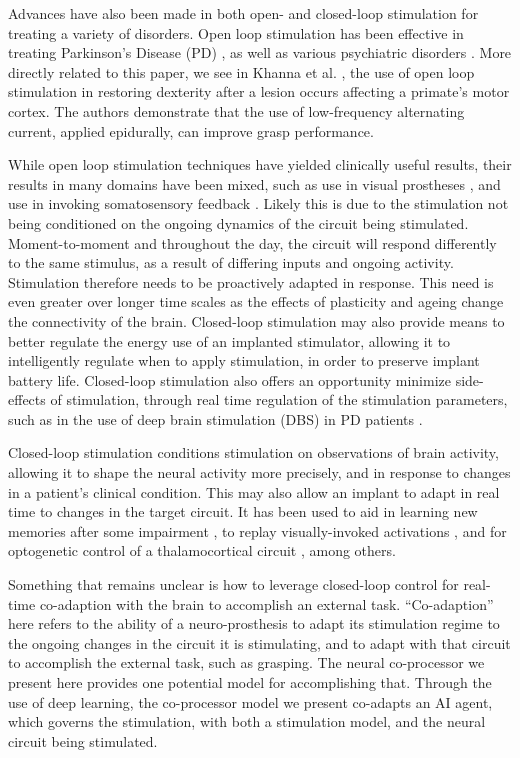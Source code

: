 \documentclass[12pt]{iopart}
\begin{document}
Advances have also been made in both open- and closed-loop stimulation for
treating a variety of disorders. Open loop stimulation has been effective in
treating Parkinson's Disease (PD) \cite{benabid.parkinsons}, as well as various
psychiatric disorders \cite{holtzheimer.psy, kisely.psy, fraint.psy}.
More directly related to this paper, we see in Khanna et al. \cite{khanna.openloop},
the use of open loop stimulation in restoring dexterity after a lesion
occurs affecting a primate's motor cortex. The authors demonstrate that
the use of low-frequency alternating current, applied epidurally,
can improve grasp performance.

While open loop stimulation techniques have yielded clinically useful results,
their results in many domains have been mixed, such as use in visual
prostheses \cite{bosking.visual}, and use in invoking somatosensory feedback
\cite{cronin.tact}. Likely this is due to the stimulation not being conditioned
on the ongoing dynamics of the circuit being stimulated. Moment-to-moment and
throughout the day, the circuit will respond differently to the same stimulus,
as a result of differing inputs and ongoing activity. Stimulation
therefore needs to be proactively adapted in response. This need is even
greater over longer time scales as the effects of plasticity and ageing change
the connectivity of the brain. Closed-loop stimulation may also provide means
to better regulate the energy use of an implanted stimulator, allowing it to
intelligently regulate when to apply stimulation, in order to preserve implant
battery life. Closed-loop stimulation also offers an opportunity minimize
side-effects of stimulation, through real time regulation
of the stimulation parameters, such as in the use of deep brain stimulation (DBS) in
PD patients \cite{little.park}.

Closed-loop stimulation conditions stimulation on observations of brain activity,
allowing it to shape the neural activity more precisely, and in response to changes
in a patient's clinical condition. This may also allow an implant to adapt
in real time to changes in the target circuit. It has been used to aid in learning
new memories after some impairment \cite{berger.closedloop, kahana.biomarker},
to replay visually-invoked activations \cite{tafazoli.acls}, and for optogenetic
control of a thalamocortical circuit \cite{bolus.opto}, among others.

Something that remains unclear is how to leverage closed-loop control for real-time
co-adaption with the brain to accomplish an external task. ``Co-adaption'' here refers
to the ability of a neuro-prosthesis to adapt its stimulation regime to the ongoing
changes in the circuit it is stimulating, and to adapt with that circuit to accomplish
the external task, such as grasping. The neural co-processor we present here provides one
potential model for accomplishing that. Through the use of deep learning, the
co-processor model we present co-adapts an AI agent, which governs the
stimulation, with both a stimulation model, and the neural circuit being stimulated.
\end{document}
